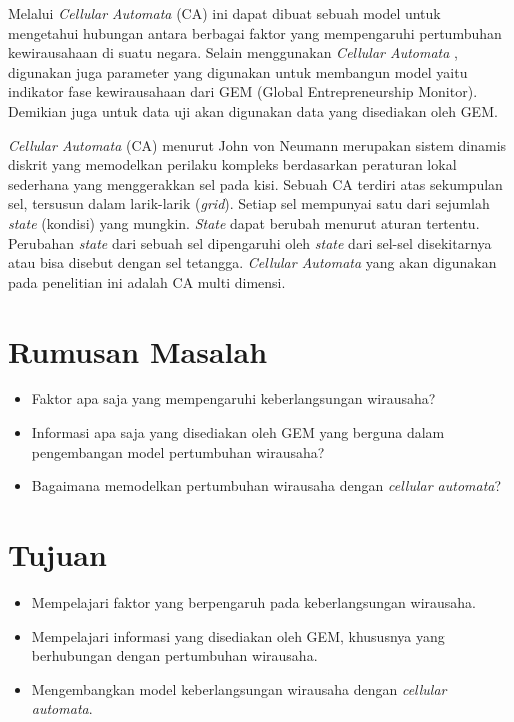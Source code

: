 \documentclass[a4paper,twoside]{article}
\begin{document}
Melalui \textit{Cellular Automata} (CA) ini dapat dibuat sebuah model untuk mengetahui hubungan antara berbagai faktor yang mempengaruhi pertumbuhan kewirausahaan di suatu negara. Selain menggunakan \textit{Cellular Automata} , digunakan juga parameter yang digunakan untuk membangun model yaitu indikator fase kewirausahaan dari GEM (Global Entrepreneurship Monitor). Demikian juga untuk data uji akan digunakan data yang disediakan oleh GEM. 


\textit{Cellular Automata} (CA) menurut John von Neumann merupakan sistem dinamis diskrit yang memodelkan perilaku kompleks berdasarkan peraturan lokal sederhana yang menggerakkan sel pada kisi. Sebuah CA terdiri atas sekumpulan sel, tersusun dalam larik-larik (\textit{grid}). Setiap sel mempunyai satu dari sejumlah \textit{state} (kondisi) yang mungkin. \textit{State} dapat berubah menurut aturan tertentu. Perubahan \textit{state} dari sebuah sel dipengaruhi oleh \textit{state} dari sel-sel disekitarnya atau bisa disebut dengan sel tetangga. \textit{Cellular Automata} yang akan digunakan pada penelitian ini adalah CA multi dimensi.

\section{Rumusan Masalah}
\begin{itemize}
	\item Faktor apa saja yang mempengaruhi keberlangsungan wirausaha?
	\item Informasi apa saja yang disediakan oleh GEM yang berguna dalam pengembangan model pertumbuhan wirausaha?
	\item Bagaimana memodelkan pertumbuhan wirausaha dengan \textit{cellular automata}?
\end{itemize}

\section{Tujuan}
\begin{itemize}
	\item Mempelajari faktor yang berpengaruh pada keberlangsungan wirausaha.
	\item Mempelajari informasi yang disediakan oleh GEM, khususnya yang berhubungan dengan pertumbuhan wirausaha.
	\item Mengembangkan model keberlangsungan wirausaha dengan \textit{cellular automata}.
\end{itemize}
\end{document}
